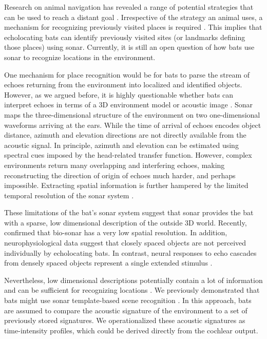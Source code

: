\documentclass[preprint,5p]{elsarticle}
\begin{document}
Research on animal navigation has revealed a range of potential strategies that can be used to reach a distant goal \citep[Reviewed by][]{Franz2000}. Irrespective of the strategy an animal uses, a mechanism for recognizing previously visited places is required \citep{Vanderelst2016,Vanderelst2017}. This implies that echolocating bats can identify previously visited sites (or landmarks defining those places) using sonar. Currently, it is still an open question of how bats use sonar to recognize locations in the environment.

One mechanism for place recognition would be for bats to parse the stream of echoes returning from the environment \cite[e.g.,][]{Yovel2009,Vanderelst2016} into localized and identified objects. However, as we argued before, it is highly questionable whether bats can interpret echoes in terms of a 3D environment model or acoustic image \citep[e.g.,][]{Vanderelst2015,Vanderelst2016,Steckel2013}. Sonar maps the three-dimensional structure of the environment on two one-dimensional waveforms arriving at the ears. While the time of arrival of echoes encodes object distance, azimuth and elevation directions are not directly available from the acoustic signal. In principle, azimuth and elevation can be estimated using spectral cues imposed by the head-related transfer function. However, complex environments return many overlapping and interfering echoes, making reconstructing the direction of origin of echoes much harder, and perhaps impossible. Extracting spatial information is further hampered by the limited temporal resolution of the sonar system \citep{Simmons1989,Wiegrebe1996,Surlykke1996}. 

These limitations of the bat's sonar system suggest that sonar provides the bat with a sparse, low dimensional description of the outside 3D world. Recently, \citet{Geberl2019} confirmed that bio-sonar has a very low spatial resolution. In addition, neurophysiological data suggest that closely spaced objects are not perceived individually by echolocating bats. In contrast, neural responses to echo cascades from densely spaced objects represent a single extended stimulus \citep{Warnecke2018}.

Nevertheless, low dimensional descriptions potentially contain a lot of information and can be sufficient for recognizing locations \citep{Kuc1997b,Kuc1997}. We previously demonstrated that bats might use sonar template-based scene recognition \citep{Vanderelst2016,Vanderelst2017}. In this approach, bats are assumed to compare the acoustic signature of the environment to a set of previously stored signatures. We operationalized these acoustic signatures as time-intensity profiles, which could be derived directly from the cochlear output.
\end{document}
